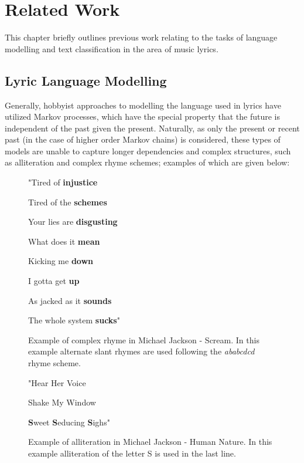 \chapter{Related Work}
\label{chap:related_work}
This chapter briefly outlines previous work relating to the tasks of language modelling and text classification in the area of music lyrics.

\section{Lyric Language Modelling}
Generally, hobbyist approaches to modelling the language used in lyrics have utilized Markov processes, which have the special property that the future is independent of the past given the present. Naturally, as only the present or recent past (in the case of higher order Markov chains) is considered, these types of models are unable to capture longer dependencies and complex structures, such as alliteration and complex rhyme schemes; examples of which are given below:

\begin{figure}[ht]
	\begin{center}
		"Tired of \textbf{injustice}
		\par
		Tired of the \textbf{schemes}
		\par
		Your lies are \textbf{disgusting}
		\par
		What does it \textbf{mean}
		\par
		Kicking me \textbf{down}
		\par
		I gotta get \textbf{up}
		\par
		As jacked as it \textbf{sounds}
		\par
		The whole system \textbf{sucks}"
	\end{center}
	\caption[Example of complex rhyme in Michael Jackson - Scream]{Example of complex rhyme in Michael Jackson - Scream. In this example alternate slant rhymes are used following the \textit{ababcdcd} rhyme scheme.}
\end{figure}

\begin{figure}[ht]
	\begin{center}
		"Hear Her Voice
		\par
		Shake My Window
		\par
		\textbf{S}weet \textbf{S}educing \textbf{S}ighs"
	\end{center}
	\caption[Example of alliteration in Michael Jackson - Human Nature]{Example of alliteration in Michael Jackson - Human Nature. In this example alliteration of the letter S is used in the last line.}
\end{figure}



